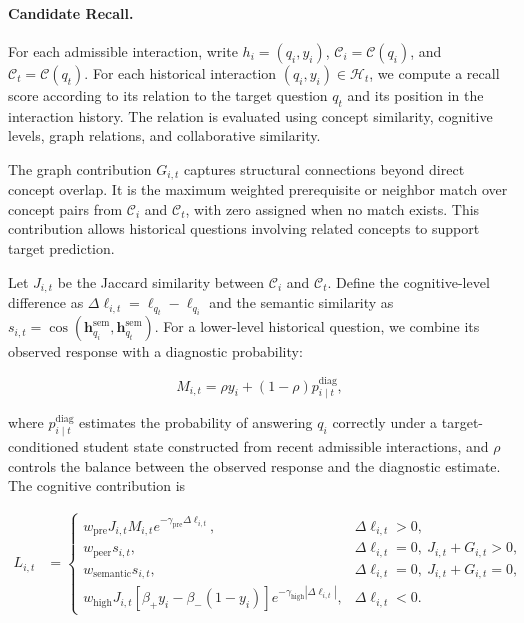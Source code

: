 \documentclass{llncs}
\begin{document}
\paragraph{Candidate Recall.}

For each admissible interaction, write $h_i=(q_i,y_i)$, $\mathcal C_i=\mathcal C(q_i)$, and $\mathcal C_t=\mathcal C(q_t)$. For each historical interaction \((q_i,y_i)\in\mathcal{H}_t\), we compute a recall score according to its relation to the target question \(q_t\) and its position in the interaction history. The relation is evaluated using concept similarity, cognitive levels, graph relations, and collaborative similarity.

The graph contribution $G_{i,t}$ captures structural connections beyond direct concept overlap. It is the maximum weighted prerequisite or neighbor match over concept pairs from $\mathcal C_i$ and $\mathcal C_t$, with zero assigned when no match exists. This contribution allows historical questions involving related concepts to support target prediction.

Let $J_{i,t}$ be the Jaccard similarity between $\mathcal C_i$ and $\mathcal C_t$. Define the cognitive-level difference as $\Delta\ell_{i,t}=\ell_{q_t}-\ell_{q_i}$ and the semantic similarity as $s_{i,t}=\cos(\mathbf h_{q_i}^{\mathrm{sem}},\mathbf h_{q_t}^{\mathrm{sem}})$. For a lower-level historical question, we combine its observed response with a diagnostic probability:

\begin{equation}
M_{i,t}
=
\rho y_i+(1-\rho)p_{i\mid t}^{\mathrm{diag}},
\end{equation}

where $p_{i\mid t}^{\mathrm{diag}}$ estimates the probability of answering $q_i$ correctly under a target-conditioned student state constructed from recent admissible interactions, and $\rho$ controls the balance between the observed response and the diagnostic estimate. The cognitive contribution is

\begin{equation}
\begin{aligned}
L_{i,t}
&=
\begin{cases}
w_{\mathrm{pre}}J_{i,t}M_{i,t}
e^{-\gamma_{\mathrm{pre}}\Delta\ell_{i,t}},
& \Delta\ell_{i,t}>0,\\
w_{\mathrm{peer}}s_{i,t},
& \Delta\ell_{i,t}=0,\ J_{i,t}+G_{i,t}>0,\\
w_{\mathrm{semantic}}s_{i,t},
& \Delta\ell_{i,t}=0,\ J_{i,t}+G_{i,t}=0,\\
w_{\mathrm{high}}J_{i,t}
[\beta_+y_i-\beta_-(1-y_i)]
e^{-\gamma_{\mathrm{high}}|\Delta\ell_{i,t}|},
& \Delta\ell_{i,t}<0.
\end{cases}
\end{aligned}
\end{equation}
\end{document}
